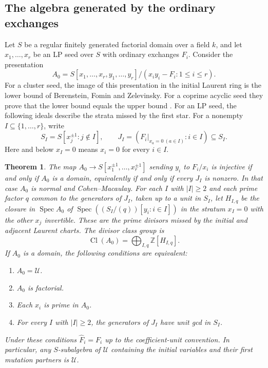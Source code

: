 \documentclass[11pt,reqno]{amsart}
\numberwithin{equation}{section}
\newtheorem{theorem}{Theorem}[section]
\theoremstyle{definition}
\theoremstyle{remark}
\DeclareMathOperator{\Spec}{Spec}
\DeclareMathOperator{\Cl}{Cl}
\begin{document}
\subsection{The algebra generated by the ordinary exchanges}

Let \(S\) be a regular finitely generated factorial domain over a field
\(k\), and let \(x_1,\ldots,x_r\) be an LP seed over \(S\) with
ordinary exchanges \(F_i\). Consider the presentation
\[ A_0=S[x_1,\ldots,x_r,y_1,\ldots,y_r]/(x_i y_i-F_i:1\le i\le r). \]
For a cluster seed, the image of this presentation in the initial
Laurent ring is the lower bound of Berenstein, Fomin and Zelevinsky.
For a coprime acyclic seed they prove that the lower bound equals the
upper bound \cite[Theorem~1.18]{BFZ}. For an LP seed, the following
ideals describe the strata missed by the first star.
For a nonempty \(I\subseteq\{1,\ldots,r\}\), write
\[ S_I=S[x_j^{\pm1}:j\notin I],\qquad J_I=(F_i|_{x_a=0\ (a\in I)}:i\in I)\subseteq S_I . \]
Here and below \(x_I=0\) means \(x_i=0\) for every \(i\in I\).

\begin{theorem}\label{thm:local-exact-exchange-strata}
The map \(A_0\to S[x_1^{\pm1},\ldots,x_r^{\pm1}]\) sending \(y_i\)
to \(F_i/x_i\) is injective if and only if \(A_0\) is a domain,
equivalently if and only if every \(J_I\) is nonzero.
In that case \(A_0\) is normal and Cohen--Macaulay.
For each \(I\) with \(|I|\ge2\) and each prime factor \(q\) common to
the generators of \(J_I\), taken up to a unit in \(S_I\), let
\(H_{I,q}\) be the closure in \(\Spec A_0\) of
\(\Spec((S_I/(q))[y_i:i\in I])\) in the stratum \(x_I=0\) with the
other \(x_j\) invertible.
These are the prime divisors missed by the initial and adjacent
Laurent charts. The divisor class group is
\[ \Cl(A_0)=\bigoplus_{I,q}\mathbb Z[H_{I,q}]. \]
If \(A_0\) is a domain, the following conditions are equivalent:
\begin{enumerate}
\item \(A_0=\mathcal U\).
\item \(A_0\) is factorial.
\item Each \(x_i\) is prime in \(A_0\).
\item For every \(I\) with \(|I|\ge2\), the generators of \(J_I\)
      have unit gcd in \(S_I\).
\end{enumerate}
Under these conditions
\(\widehat F_i=F_i\) up to the coefficient-unit convention.
In particular, any \(S\)-subalgebra of \(\mathcal U\) containing the
initial variables and their first mutation partners is \(\mathcal U\).
\end{theorem}
\end{document}
